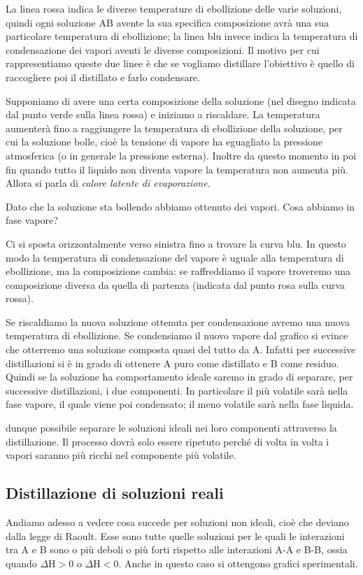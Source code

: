 La linea rossa indica le diverse temperature di ebollizione delle varie soluzioni, quindi ogni soluzione AB avente la sua specifica composizione avrà una sua particolare temperatura di ebollizione; la linea blu invece indica la temperatura di condensazione dei vapori aventi le diverse composizioni. Il motivo per cui rappresentiamo queste due linee è che se vogliamo distillare l'obiettivo è quello di raccogliere poi il distillato e farlo condensare.

Supponiamo di avere una certa composizione della soluzione (nel disegno indicata dal punto verde sulla linea rossa) e iniziamo a riscaldare. La temperatura aumenterà fino a raggiungere la temperatura di ebollizione della soluzione, per cui la soluzione bolle, cioè la tensione di vapore ha eguagliato la pressione atmosferica (o in generale la pressione esterna). Inoltre da questo momento in poi fin quando  tutto il liquido non diventa vapore la temperatura non aumenta più. Allora si parla di \textit{calore latente di evaporazione}.

Dato che la soluzione sta bollendo abbiamo ottenuto dei vapori. Cosa abbiamo in fase vapore?

Ci si sposta orizzontalmente verso sinistra fino a trovare la curva blu. In questo modo la temperatura di condensazione del vapore è uguale alla temperatura di ebollizione, ma la composizione cambia: se raffreddiamo il vapore troveremo una composizione diversa da quella di partenza (indicata dal punto rosa sulla curva rossa).

Se riscaldiamo la nuova soluzione ottenuta per condensazione avremo una nuova temperatura di ebollizione. Se condensiamo il nuovo vapore dal grafico si evince che otterremo una soluzione composta quasi del tutto da A. Infatti per successive distillazioni si è in grado di ottenere A puro come distillato e B come residuo. Quindi se la soluzione ha comportamento ideale saremo in grado di separare, per successive distillazioni, i due componenti. In particolare il più volatile sarà nella fase vapore, il quale viene poi condensato; il meno volatile sarà nella fase liquida.

\E dunque possibile separare le soluzioni ideali nei loro componenti attraverso la distillazione. Il processo dovrà solo essere ripetuto perché di volta in volta i vapori saranno più ricchi nel componente più volatile.
\subsection{Distillazione di soluzioni reali}
Andiamo adesso a vedere cosa succede per soluzioni non ideali, cioè che deviano dalla legge di Raoult. Esse sono tutte quelle soluzioni per le quali le interazioni tra A e B sono o più deboli o più forti rispetto alle interazioni A-A e B-B, ossia quando $\Delta$H$>$0 o $\Delta$H$<$0. Anche in questo caso si ottengono grafici sperimentali.

